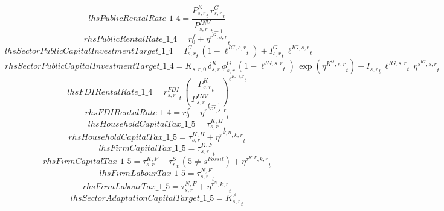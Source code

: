 \begin{dmath*}
lhsPublicRentalRate\_1\_4 = \frac{{{P^K_{s,r}}}_{t}\, {{r^G_{s,r}}}_{t}}{{{P^{INV}_{s,r}}}_{t-1}}
\end{dmath*}
\begin{dmath*}
rhsPublicRentalRate\_1\_4 = {{r^f_0}}+{{\eta^{r^G,s,r}}}_{t}
\end{dmath*}
\begin{dmath*}
lhsSectorPublicCapitalInvestmentTarget\_1\_4 = {{I^G_{s,r}}}_{t}\, \left(1-{{\ell^{IG,s,r}}}_{t}\right)+{{I^G_{s,r}}}_{t}\, {{\ell^{IG,s,r}}}_{t}
\end{dmath*}
\begin{dmath*}
rhsSectorPublicCapitalInvestmentTarget\_1\_4 = {{K_{s,r,0}}}\, {{\delta^{K}_{s,r}}}\, {{\phi^{G}_{s,r}}}\, \left(1-{{\ell^{IG,s,r}}}_{t}\right)\, \exp\left({{\eta^{K^G,s,r}}}_{t}\right)+{{I_{s,r}}}_{t}\, {{\ell^{IG,s,r}}}_{t}\, {{\eta^{s^{IG},s,r}}}_{t}
\end{dmath*}
\begin{dmath*}
lhsFDIRentalRate\_1\_4 = {{r^{FDI}_{s,r}}}_{t}\, \left(\frac{{{P^K_{s,r}}}_{t}}{{{P^{INV}_{s,r}}}_{t-1}}\right)^{{{\ell^{IG,s,r}}}_{t}}
\end{dmath*}
\begin{dmath*}
rhsFDIRentalRate\_1\_4 = {{r^f_0}}+{{\eta^{r^{FDI},s,r}}}_{t}
\end{dmath*}
\begin{dmath*}
lhsHouseholdCapitalTax\_1\_5 = {{\tau^{K,H}_{s,r}}}_{t}
\end{dmath*}
\begin{dmath*}
rhsHouseholdCapitalTax\_1\_5 = {{\tau^{K,H}_{s,r}}}+{{\eta^{\tau^{K,H},k,r}}}_{t}
\end{dmath*}
\begin{dmath*}
lhsFirmCapitalTax\_1\_5 = {{\tau^{K,F}_{s,r}}}_{t}
\end{dmath*}
\begin{dmath*}
rhsFirmCapitalTax\_1\_5 = {{\tau^{K,F}_{s,r}}}-{{\tau^{S}_{r}}}_{t}\, \left(5\neq {{s^{Fossil}}}\right)+{{\eta^{\tau^{K,F},k,r}}}_{t}
\end{dmath*}
\begin{dmath*}
lhsFirmLabourTax\_1\_5 = {{\tau^{N,F}_{s,r}}}_{t}
\end{dmath*}
\begin{dmath*}
rhsFirmLabourTax\_1\_5 = {{\tau^{N,F}_{s,r}}}+{{\eta^{\tau^{N},k,r}}}_{t}
\end{dmath*}
\begin{dmath*}
lhsSectorAdaptationCapitalTarget\_1\_5 = {{K^{A}_{s,r}}}_{t}
\end{dmath*}
